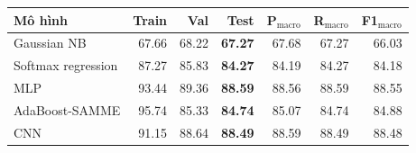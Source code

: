 \begin{tabular}{lrrrrrr}
\toprule
Mô hình & Train & Val & Test & P$_{\text{macro}}$ & R$_{\text{macro}}$ & F1$_{\text{macro}}$ \\
\midrule
Gaussian NB & 67.66 & 68.22 & \textbf{67.27} & 67.68 & 67.27 & 66.03 \\
Softmax regression & 87.27 & 85.83 & \textbf{84.27} & 84.19 & 84.27 & 84.18 \\
MLP & 93.44 & 89.36 & \textbf{88.59} & 88.56 & 88.59 & 88.55 \\
AdaBoost-SAMME & 95.74 & 85.33 & \textbf{84.74} & 85.07 & 84.74 & 84.88 \\
CNN & 91.15 & 88.64 & \textbf{88.49} & 88.59 & 88.49 & 88.48 \\
\bottomrule
\end{tabular}
